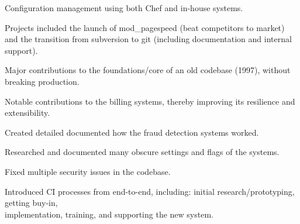 \item Configuration management using both Chef and in-house systems.
\item Projects included the launch of mod\_pagespeed (beat competitors to market) and the transition from subversion to git (including documentation and internal support).
\item Major contributions to the foundations/core of an old codebase (1997), without breaking production.
\item Notable contributions to the billing systems, thereby improving its resilience and extensibility.
\item Created detailed documented how the fraud detection systems worked.
\item Researched and documented many obscure settings and flags of the systems.
\item Fixed multiple security issues in the codebase.
\item Introduced CI processes from end-to-end, including: initial research/prototyping, getting buy-in, \\ implementation, training, and supporting the new system.

